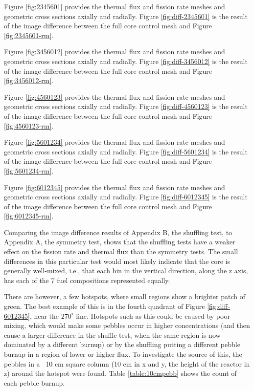 


Figure \ref{fig:2345601} provides the thermal flux and fission rate meshes and geometric cross sections axially and radially.  Figure \ref{fig:diff-2345601} is the result of the image difference between the full core control mesh and Figure \ref{fig:2345601-rm}.




Figure \ref{fig:3456012} provides the thermal flux and fission rate meshes and geometric cross sections axially and radially.  Figure \ref{fig:diff-3456012} is the result of the image difference between the full core control mesh and Figure \ref{fig:3456012-rm}.




Figure \ref{fig:4560123} provides the thermal flux and fission rate meshes and geometric cross sections axially and radially.  Figure \ref{fig:diff-4560123} is the result of the image difference between the full core control mesh and Figure \ref{fig:4560123-rm}.




Figure \ref{fig:5601234} provides the thermal flux and fission rate meshes and geometric cross sections axially and radially.  Figure \ref{fig:diff-5601234} is the result of the image difference between the full core control mesh and Figure \ref{fig:5601234-rm}.




Figure \ref{fig:6012345} provides the thermal flux and fission rate meshes and geometric cross sections axially and radially.  Figure \ref{fig:diff-6012345} is the result of the image difference between the full core control mesh and Figure \ref{fig:6012345-rm}.

Comparing the image difference results of Appendix B, the shuffling test, to Appendix A, the symmetry test, shows that the shuffling tests have a weaker effect on the fission rate and thermal flux than the symmetry tests.  The small differences in this particular test would most likely indicate that the core is generally well-mixed, i.e., that each bin in the vertical direction, along the z axis, has each of the 7 fuel compositions represented equally.

There are however, a few hotspots, where small regions show a brighter patch of green.  The best example of this is in the fourth quadrant of Figure \ref{fig:diff-6012345}, near the $270^{\circ}$ line.  Hotspots such as this could be caused by poor mixing, which would make some pebbles occur in higher concentrations (and then cause a larger difference in the shuffle test, when the same region is now dominated by a different burnup) or by the shuffling putting a different pebble burnup in a region of lower or higher flux.  To investigate the source of this, the pebbles in a ~10 cm square column (10 cm in x and y, the height of the reactor in z) around the hotspot were found.  Table \ref{table:10cmpebb} shows the count of each pebble burnup.

